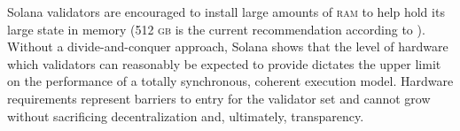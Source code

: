 Solana validators are encouraged to install large amounts of \textsc{ram} to help hold its large state in memory (512 \textsc{gb} is the current recommendation according to \cite{solana2024solana}). Without a divide-and-conquer approach, Solana shows that the level of hardware which validators can reasonably be expected to provide dictates the upper limit on the performance of a totally synchronous, coherent execution model. Hardware requirements represent barriers to entry for the validator set and cannot grow without sacrificing decentralization and, ultimately, transparency.
